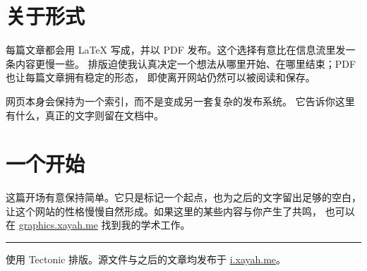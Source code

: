 \documentclass[11pt,a4paper,fontset=fandol]{ctexart}
\begin{document}
\section{关于形式}

每篇文章都会用 \LaTeX{} 写成，并以 PDF 发布。这个选择有意比在信息流里发一条内容更慢一些。
排版迫使我认真决定一个想法从哪里开始、在哪里结束；PDF 也让每篇文章拥有稳定的形态，
即使离开网站仍然可以被阅读和保存。

网页本身会保持为一个索引，而不是变成另一套复杂的发布系统。
它告诉你这里有什么，真正的文字则留在文档中。

\section{一个开始}

这篇开场有意保持简单。它只是标记一个起点，也为之后的文字留出足够的空白，
让这个网站的性格慢慢自然形成。如果这里的某些内容与你产生了共鸣，
也可以在 \href{https://graphics.xayah.me/}{graphics.xayah.me} 找到我的学术工作。

\vfill
{\color{rulecolor}\rule{\textwidth}{0.5pt}\par}
{\small\color{softink}使用 Tectonic 排版。源文件与之后的文章均发布于
\href{https://i.xayah.me/}{i.xayah.me}。\par}
\end{document}
